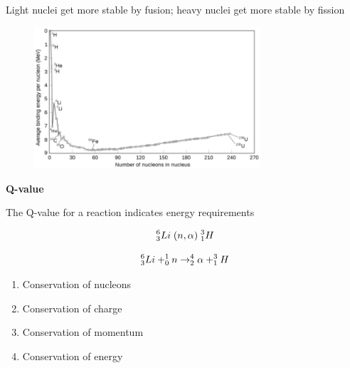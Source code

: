 \documentclass[aspectratio=1610,pdftex,dvipsnames,compress,xcolor={dvipsnames}]{beamer}
\begin{document}
\begin{frame}{Light nuclei get more stable by fusion; heavy nuclei get more stable by fission}
    \begin{figure}
        \centering
        \href{http://ch302.cm.utexas.edu/images302/binding-energy.png}{\includegraphics[width=0.75\textwidth]{binding.energy.invert.jpg}}
    \end{figure}
\end{frame}


\begin{frame}[plain]{}
    \centering\LARGE\textbf{Q-value}
\end{frame}


\addtocounter{framenumber}{-1}
\begin{frame}{The Q-value for a reaction indicates energy requirements}

    \begin{equation}
        \LARGE
        ^6_3Li \; (n,\alpha) \; ^3_1H
    \end{equation}

    \begin{equation}
        \LARGE
        ^6_3Li + ^1_0n \rightarrow ^4_2\alpha + ^3_1H
    \end{equation}

    \vspace*{\fill}

    \begin{enumerate}[series=outerlist,topsep=0pt,itemsep=15pt,leftmargin=*,label=(\arabic*)]
        \item Conservation of nucleons
        \item Conservation of charge
        \item Conservation of momentum
        \item Conservation of energy
    \end{enumerate}
\end{frame}
\end{document}
